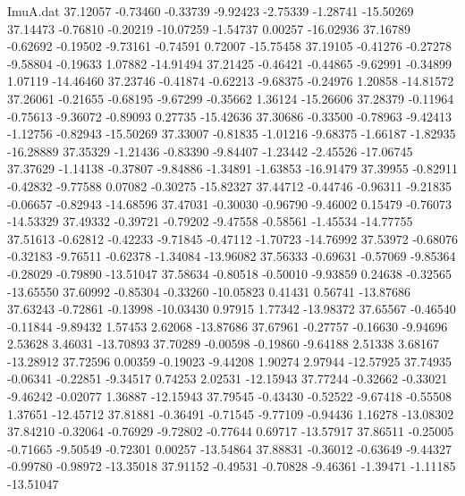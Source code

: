 \begin{filecontents}{ImuA.dat}
  37.12057   -0.73460   -0.33739   -9.92423   -2.75339   -1.28741  -15.50269
  37.14473   -0.76810   -0.20219  -10.07259   -1.54737    0.00257  -16.02936
  37.16789   -0.62692   -0.19502   -9.73161   -0.74591    0.72007  -15.75458
  37.19105   -0.41276   -0.27278   -9.58804   -0.19633    1.07882  -14.91494
  37.21425   -0.46421   -0.44865   -9.62991   -0.34899    1.07119  -14.46460
  37.23746   -0.41874   -0.62213   -9.68375   -0.24976    1.20858  -14.81572
  37.26061   -0.21655   -0.68195   -9.67299   -0.35662    1.36124  -15.26606
  37.28379   -0.11964   -0.75613   -9.36072   -0.89093    0.27735  -15.42636
  37.30686   -0.33500   -0.78963   -9.42413   -1.12756   -0.82943  -15.50269
  37.33007   -0.81835   -1.01216   -9.68375   -1.66187   -1.82935  -16.28889
  37.35329   -1.21436   -0.83390   -9.84407   -1.23442   -2.45526  -17.06745
  37.37629   -1.14138   -0.37807   -9.84886   -1.34891   -1.63853  -16.91479
  37.39955   -0.82911   -0.42832   -9.77588    0.07082   -0.30275  -15.82327
  37.44712   -0.44746   -0.96311   -9.21835   -0.06657   -0.82943  -14.68596
  37.47031   -0.30030   -0.96790   -9.46002    0.15479   -0.76073  -14.53329
  37.49332   -0.39721   -0.79202   -9.47558   -0.58561   -1.45534  -14.77755
  37.51613   -0.62812   -0.42233   -9.71845   -0.47112   -1.70723  -14.76992
  37.53972   -0.68076   -0.32183   -9.76511   -0.62378   -1.34084  -13.96082
  37.56333   -0.69631   -0.57069   -9.85364   -0.28029   -0.79890  -13.51047
  37.58634   -0.80518   -0.50010   -9.93859    0.24638   -0.32565  -13.65550
  37.60992   -0.85304   -0.33260  -10.05823    0.41431    0.56741  -13.87686
  37.63243   -0.72861   -0.13998  -10.03430    0.97915    1.77342  -13.98372
  37.65567   -0.46540   -0.11844   -9.89432    1.57453    2.62068  -13.87686
  37.67961   -0.27757   -0.16630   -9.94696    2.53628    3.46031  -13.70893
  37.70289   -0.00598   -0.19860   -9.64188    2.51338    3.68167  -13.28912
  37.72596    0.00359   -0.19023   -9.44208    1.90274    2.97944  -12.57925
  37.74935   -0.06341   -0.22851   -9.34517    0.74253    2.02531  -12.15943
  37.77244   -0.32662   -0.33021   -9.46242   -0.02077    1.36887  -12.15943
  37.79545   -0.43430   -0.52522   -9.67418   -0.55508    1.37651  -12.45712
  37.81881   -0.36491   -0.71545   -9.77109   -0.94436    1.16278  -13.08302
  37.84210   -0.32064   -0.76929   -9.72802   -0.77644    0.69717  -13.57917
  37.86511   -0.25005   -0.71665   -9.50549   -0.72301    0.00257  -13.54864
  37.88831   -0.36012   -0.63649   -9.44327   -0.99780   -0.98972  -13.35018
  37.91152   -0.49531   -0.70828   -9.46361   -1.39471   -1.11185  -13.51047

\end{filecontents}
